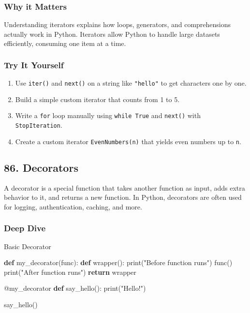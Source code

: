 \documentclass[
  letterpaper,
  DIV=11,
  numbers=noendperiod]{scrreprt}
\newenvironment{Shaded}{\begin{snugshade}}{\end{snugshade}}
\newcommand{\AttributeTok}[1]{\textcolor[rgb]{0.40,0.45,0.13}{#1}}
\newcommand{\BuiltInTok}[1]{\textcolor[rgb]{0.00,0.23,0.31}{#1}}
\newcommand{\ControlFlowTok}[1]{\textcolor[rgb]{0.00,0.23,0.31}{\textbf{#1}}}
\newcommand{\KeywordTok}[1]{\textcolor[rgb]{0.00,0.23,0.31}{\textbf{#1}}}
\newcommand{\NormalTok}[1]{\textcolor[rgb]{0.00,0.23,0.31}{#1}}
\newcommand{\StringTok}[1]{\textcolor[rgb]{0.13,0.47,0.30}{#1}}
\providecommand{\tightlist}{%
  \setlength{\itemsep}{0pt}\setlength{\parskip}{0pt}}
\begin{document}
\subsubsection{Why it Matters}\label{why-it-matters-84}

Understanding iterators explains how loops, generators, and
comprehensions actually work in Python. Iterators allow Python to handle
large datasets efficiently, consuming one item at a time.

\subsubsection{Try It Yourself}\label{try-it-yourself-84}

\begin{enumerate}
\def\labelenumi{\arabic{enumi}.}
\tightlist
\item
  Use \texttt{iter()} and \texttt{next()} on a string like
  \texttt{"hello"} to get characters one by one.
\item
  Build a simple custom iterator that counts from 1 to 5.
\item
  Write a \texttt{for} loop manually using \texttt{while\ True} and
  \texttt{next()} with \texttt{StopIteration}.
\item
  Create a custom iterator \texttt{EvenNumbers(n)} that yields even
  numbers up to \texttt{n}.
\end{enumerate}

\subsection{86. Decorators}\label{decorators}

A decorator is a special function that takes another function as input,
adds extra behavior to it, and returns a new function. In Python,
decorators are often used for logging, authentication, caching, and
more.

\subsubsection{Deep Dive}\label{deep-dive-85}

Basic Decorator

\begin{Shaded}
\begin{Highlighting}[]
\KeywordTok{def}\NormalTok{ my\_decorator(func):}
    \KeywordTok{def}\NormalTok{ wrapper():}
        \BuiltInTok{print}\NormalTok{(}\StringTok{"Before function runs"}\NormalTok{)}
\NormalTok{        func()}
        \BuiltInTok{print}\NormalTok{(}\StringTok{"After function runs"}\NormalTok{)}
    \ControlFlowTok{return}\NormalTok{ wrapper}

\AttributeTok{@my\_decorator}
\KeywordTok{def}\NormalTok{ say\_hello():}
    \BuiltInTok{print}\NormalTok{(}\StringTok{"Hello!"}\NormalTok{)}

\NormalTok{say\_hello()}
\end{Highlighting}
\end{Shaded}
\end{document}

